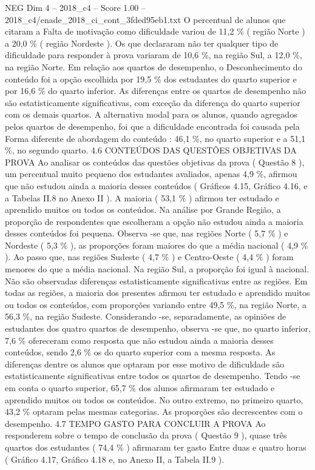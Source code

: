\begin{textsample}{NEG Dim 4 – 2018\_c4 – Score 1.00 – 2018\_c4/enade\_2018\_ci\_cont\_3fded95eb1.txt}
O percentual de alunos que citaram a Falta de motivação como dificuldade variou de 11,2 \% ( região Norte ) a 20,0 \% ( região Nordeste ).
Os que declararam não ter qualquer tipo de dificuldade para responder à prova variaram de 10,6 \%, na região Sul, a 12,0 \%, na região Norte.
Em relação aos quartos de desempenho, o Desconhecimento do conteúdo foi a opção escolhida por 19,5 \% dos estudantes do quarto superior e por 16,6 \% do quarto inferior.
As diferenças entre os quartos de desempenho não são estatisticamente significativas, com exceção da diferença do quarto superior com os demais quartos.
A alternativa modal para os alunos, quando agregados pelos quartos de desempenho, foi que a dificuldade encontrada foi causada pela Forma diferente de abordagem do conteúdo : 46,1 \%, no quarto superior e a 51,1 \%, no segundo quarto. 4.6 CONTEÚDOS DAS QUESTÕES OBJETIVAS DA PROVA Ao analisar os conteúdos das questões objetivas da prova ( Questão 8 ), um percentual muito pequeno dos estudantes avaliados, apenas 4,9 \%, afirmou que não estudou ainda a maioria desses conteúdos ( Gráficos 4.15, Gráfico 4.16, e a Tabelas II.8 no Anexo II ).
A maioria ( 53,1 \% ) afirmou ter estudado e aprendido muitos ou todos os conteúdos.
Na análise por Grande Região, a proporção de respondentes que escolheram a opção não estudou ainda a maioria desses conteúdos foi pequena.
Observa -se que, nas regiões Norte ( 5,7 \% ) e Nordeste ( 5,3 \% ), as proporções foram maiores do que a média nacional ( 4,9 \% ).
Ao passo que, nas regiões Sudeste ( 4,7 \% ) e Centro-Oeste ( 4,4 \% ) foram menores do que a média nacional.
Na região Sul, a proporção foi igual à nacional.
Não são observadas diferenças estatisticamente significativas entre as regiões.
Em todas as regiões, a maioria dos presentes afirmou ter estudado e aprendido muitos ou todos os conteúdos, com proporções variando entre 49,5 \%, na região Norte, a 56,3 \%, na região Sudeste.
Considerando -se, separadamente, as opiniões de estudantes dos quatro quartos de desempenho, observa -se que, no quarto inferior, 7,6 \% ofereceram como resposta que não estudou ainda a maioria desses conteúdos, sendo 2,6 \% os do quarto superior com a mesma resposta.
As diferenças dentre os alunos que optaram por esse motivo de dificuldade são estatisticamente significativas entre todos os quartos de desempenho.
Tendo -se em conta o quarto superior, 65,7 \% dos alunos afirmaram ter estudado e aprendido muitos ou todos os conteúdos.
No outro extremo, no primeiro quarto, 43,2 \% optaram pelas mesmas categorias.
As proporções são decrescentes com o desempenho. 4.7 TEMPO GASTO PARA CONCLUIR A PROVA Ao responderem sobre o tempo de conclusão da prova ( Questão 9 ), quase três quartos dos estudantes ( 74,4 \% ) afirmaram ter gasto Entre duas e quatro horas ( Gráfico 4.17, Gráfico 4.18 e, no Anexo II, a Tabela II.9 ).

\end{textsample}
